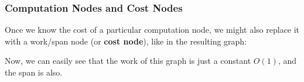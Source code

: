 \documentclass[aspectratio=169, handout]{beamer}
\newcommand{\hex}[4][]{\node[hex, #1, minimum size=1cm] (#2) {$W$: #3 \\ $S$: #4}}
\begin{document}
\begin{frame}[fragile]
  \frametitle{Computation Nodes and Cost Nodes}

  \begin{center}
  \begin{minipage}{0.5\textwidth}
    \raggedright

    Once we know the cost of a particular computation node, we might also
    replace it with a work/span node (or \textbf{cost node}), like in the resulting graph:

    \vspace{10pt}

    Now, we can easily see that the work of this graph is just a constant $O(1)$,
    and the span is also.
  \end{minipage}
  \begin{minipage}{0.49\textwidth}
    \centering
  \end{minipage}
  \end{center}
\end{frame}
\end{document}

